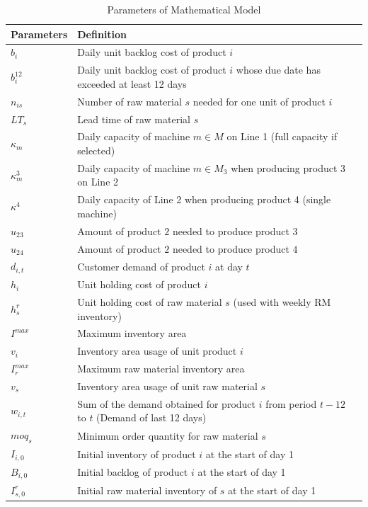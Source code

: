 \documentclass[11pt]{article}
\begin{document}
\begin{table}[h!]
\centering
\caption{Parameters of Mathematical Model}
\begin{tabular}{@{}lp{11cm}@{}}
\toprule
\textbf{Parameters} & \textbf{Definition} \\\midrule
$b_i$& Daily unit backlog cost of product $i$\\
$b_i^{12}$& Daily unit backlog cost of product $i$ whose due date has exceeded at least 12 days\\
$n_{is}$& Number of raw material $s$ needed for one unit of product $i$\\
$LT_s$& Lead time of raw material $s$ \\
$\kappa_m$& Daily capacity of machine $m\in M$ on Line 1 (full capacity if selected)\\
$\kappa^{3}_m$& Daily capacity of machine $m\in M_3$ when producing product 3 on Line 2\\
$\kappa^{4}$& Daily capacity of Line 2 when producing product 4 (single machine)\\
$u_{23}$& Amount of product $2$ needed to produce product $3$\\
$u_{24}$& Amount of product $2$ needed to produce product $4$\\
$d_{i,t}$& Customer demand of product $i$ at day $t$\\
$h_i$& Unit holding cost of product $i$\\
$h_s^{r}$& Unit holding cost of raw material $s$ (used with weekly RM inventory)\\
$I^{max}$& Maximum inventory area \\
$v_i$& Inventory area usage of unit product $i$\\
$I_r^{max}$& Maximum raw material inventory area\\
$v_s$& Inventory area usage of unit raw material $s$\\
$w_{i,t}$& Sum of the demand obtained for product $i$ from period $t-12$ to $t$ (Demand of last 12 days)\\
$moq_s$& Minimum order quantity for raw material $s$\\
$I_{i,0}$& Initial inventory of product $i$ at the start of day 1\\
$B_{i,0}$& Initial backlog of product $i$ at the start of day 1\\
$I^{r}_{s,0}$& Initial raw material inventory of $s$ at the start of day 1\\
\bottomrule
\end{tabular}
\end{table}
\end{document}
